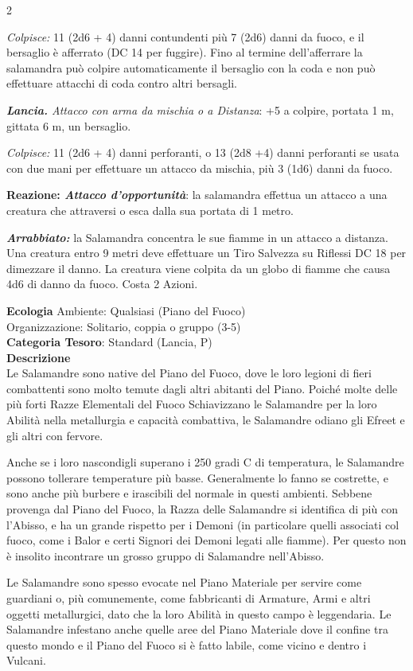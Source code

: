 \begin{multicols}{2}
{\emph{Colpisce:} 11 (2d6 + 4) danni contundenti più 7 (2d6) danni da fuoco, e il bersaglio è afferrato (DC 14 per fuggire). Fino al termine dell'afferrare la salamandra può colpire automaticamente il bersaglio con la coda e non può effettuare attacchi di coda contro altri bersagli.

\emph{\textbf{Lancia.} Attacco con arma da mischia o a Distanza}: +5 a colpire, portata 1 m, gittata 6 m, un bersaglio.

\emph{Colpisce:} 11 (2d6 + 4) danni perforanti, o 13 (2d8 +4) danni perforanti se usata con due mani per effettuare un attacco da mischia, più 3 (1d6) danni da fuoco.

\textbf{Reazione: \emph{Attacco d'opportunità}}: la salamandra effettua un attacco a una creatura che attraversi o esca dalla sua portata di 1 metro.

\emph{\textbf{Arrabbiato:}} la Salamandra concentra le sue fiamme in un attacco a distanza. Una creatura entro 9 metri deve effettuare un Tiro Salvezza su Riflessi DC 18 per dimezzare il danno. La creatura viene colpita da un globo di fiamme che causa 4d6 di danno da fuoco. Costa 2 Azioni.

\textbf{Ecologia}
Ambiente: Qualsiasi (Piano del Fuoco)\\
Organizzazione: Solitario, coppia o gruppo (3-5)\\
\textbf{Categoria Tesoro}: Standard (Lancia, P)\\
\textbf{Descrizione}\\
Le Salamandre sono native del Piano del Fuoco, dove le loro legioni di fieri combattenti sono molto temute dagli altri abitanti del Piano. Poiché molte delle più forti Razze Elementali del Fuoco Schiavizzano le Salamandre per la loro Abilità nella metallurgia e capacità combattiva, le Salamandre odiano gli Efreet e gli altri con fervore.

Anche se i loro nascondigli superano i 250 gradi C di temperatura, le Salamandre possono tollerare temperature più basse. Generalmente lo fanno se costrette, e sono anche più burbere e irascibili del normale in questi ambienti. Sebbene provenga dal Piano del Fuoco, la Razza delle Salamandre si identifica di più con l'Abisso, e ha un grande rispetto per i Demoni (in particolare quelli associati col fuoco, come i Balor e certi Signori dei Demoni legati alle fiamme). Per questo non è insolito incontrare un grosso gruppo di Salamandre nell'Abisso.

Le Salamandre sono spesso evocate nel Piano Materiale per servire come guardiani o, più comunemente, come fabbricanti di Armature, Armi e altri oggetti metallurgici, dato che la loro Abilità in questo campo è leggendaria. Le Salamandre infestano anche quelle aree del Piano Materiale dove il confine tra questo mondo e il Piano del Fuoco si è fatto labile, come vicino e dentro i Vulcani.

}
\end{multicols}
